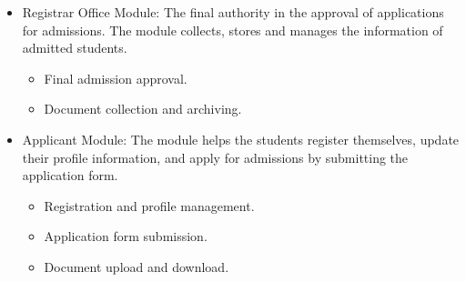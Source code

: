 \begin{itemize}[leftmargin=*, labelsep=0.3cm]
    \vspace{0.2cm}
    \item{Registrar Office Module:} 
    The final authority in the approval of applications for admissions. The module collects, stores and manages the information of admitted students.
    \begin{itemize}
        \item Final admission approval.
        \item Document collection and archiving.
    \end{itemize}
    
    \vspace{0.2cm}
    \item{Applicant Module:} 
    The module helps the students register themselves, update their profile information, and apply for admissions by submitting the application form.
    \begin{itemize}
        \item Registration and profile management.
        \item Application form submission.
        \item Document upload and download.
    \end{itemize}
\end{itemize}
